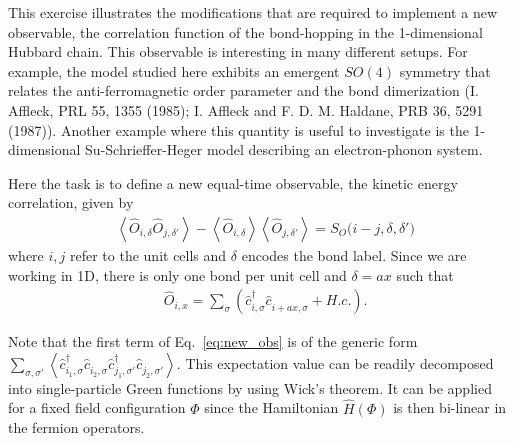 \documentclass[10pt,modern]{scrartcl}
\numberwithin{exerciseitem}{exercise} %
\begin{document}
This exercise illustrates the modifications that are required to implement a new observable, the correlation function of the bond-hopping in the 1-dimensional Hubbard chain. This observable is interesting in many different setups. For example, the model studied here exhibits an emergent $SO(4)$ symmetry that relates the anti-ferromagnetic order parameter and the bond dimerization (I. Affleck, PRL 55, 1355 (1985); I. Affleck and F. D. M. Haldane, PRB 36, 5291 (1987)). Another example where this quantity is useful to investigate is the 1-dimensional Su-Schrieffer-Heger model describing an electron-phonon system.



Here the task is to define a new equal-time observable, the kinetic energy correlation, given by
\begin{align}
&\left\langle \hat{O}_{i,\delta} \hat{O}_{j,\delta'} \right\rangle  -  \left\langle \hat{O}_{i,\delta} \right\rangle \left\langle \hat{O}_{j,\delta'} \right\rangle  =  S_O\big(i-j,\delta,\delta'\big) \label{eq:new_obs}
\end{align}
where $i,j$ refer to the unit cells and $\delta$ encodes the bond label. Since we are working in 1D, there is only one bond per unit cell and $\delta=ax$ such that
\begin{align}
&\hat{O}_{i,x} = \sum_{\sigma}\left( \hat{c}^\dagger_{i,\sigma}\hat{c}^{\phantom\dagger}_{i+ax,\sigma} +H.c. \right).
\end{align}


Note that the first term of Eq.~\ref{eq:new_obs} is of the generic form $\sum_{\sigma,\sigma'}\left\langle \hat{c}^\dagger_{i_1,\sigma}\hat{c}^{\phantom\dagger}_{i_2,\sigma} \hat{c}^\dagger_{j_1,\sigma'}\hat{c}^{\phantom\dagger}_{j_2,\sigma'} \right\rangle$. This expectation value can be readily decomposed into single-particle Green functions by using Wick's theorem. It can be applied for a fixed field configuration $\Phi$ since the Hamiltonian $\hat{H}(\Phi)$ is then bi-linear in the fermion operators.
\end{document}

